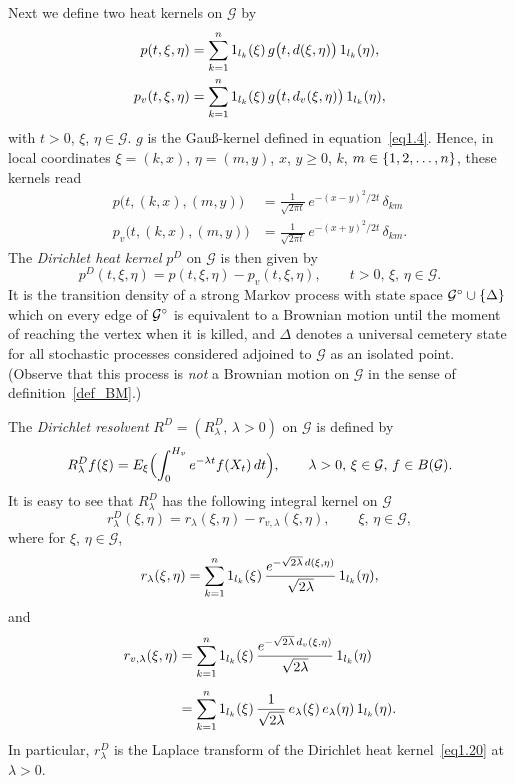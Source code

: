 \documentclass[11pt,a4paper]{amsart}
\newcommand{\gd}{\delta}
\newcommand{\gl}{\lambda}
\newcommand{\gD}{\Delta}
\newcommand{\cG}{\mathcal{G}}
\newcommand{\1}{1}
\theoremstyle{remark}
\newcommand{\op}{\ensuremath^\circ}
\newcommand{\sgl}{\ensuremath\sqrt{2\gl}}
\newcommand{\sn}{\ensuremath\{1,2,\dotsc,n\}}
\newcommand{\onel}[1][k]{\ensuremath1_{l_{#1}}}
\numberwithin{equation}{section}
\begin{document}
Next we define two heat kernels on $\cG$ by
\begin{align}
    p(t,\xi,\eta)   &= \sum_{k=1}^n \onel(\xi)\, g\bigl(t,d(\xi,\eta)\bigr)\,\onel(\eta),
                    \label{eq1.16}\\
    p_v(t,\xi,\eta) &= \sum_{k=1}^n \onel(\xi)\, g\bigl(t,d_v(\xi,\eta)\bigr)\,\onel(\eta),
                    \label{eq1.17}
\end{align}
with $t>0$, $\xi$, $\eta\in\cG$. $g$ is the Gau{\ss}-kernel defined in
equation~\eqref{eq1.4}. Hence, in local coordinates $\xi=(k,x)$, $\eta=(m,y)$, $x$, $y\ge
0$, $k$, $m\in\sn$, these kernels read
\begin{align}
    p\bigl(t,(k,x),(m,y)\bigr)
        &= \frac{1}{\sqrt{2\pi t}}\,e^{-(x-y)^2/2t}\,\gd_{km}\label{eq1.18}\\
    p_v\bigl(t,(k,x),(m,y)\bigr)
        &= \frac{1}{\sqrt{2\pi t}}\,e^{-(x+y)^2/2t}\,\gd_{km}\label{eq1.19}.
\end{align}
The \emph{Dirichlet heat kernel} $p^D$ on $\cG$ is then given by
\begin{equation}    \label{eq1.20}
    p^D(t,\xi,\eta) = p(t,\xi,\eta) - p_v(t,\xi,\eta),\qquad t>0,\,\xi,\,\eta\in\cG.
\end{equation}
It is the transition density of a strong Markov process with state space
$\cG\op\cup\{\gD\}$ which on every edge of $\cG\op$ is equivalent to a Brownian
motion until the moment of reaching the vertex when it is
killed, and $\gD$ denotes a universal cemetery state for all stochastic processes
considered adjoined to $\cG$ as an isolated point. (Observe that this process is
\emph{not} a Brownian motion on $\cG$ in the sense of
definition~\ref{def_BM}.)

The \emph{Dirichlet resolvent} $R^D = (R^D_\gl,\,\gl>0)$ on $\cG$ is defined by
\begin{equation}    \label{eq1.21}
    R^D_\gl f(\xi)
        = E_\xi\Bigl(\int_0^{H_v} e^{-\gl t} f(X_t)\,dt\Bigr),\qquad
            \gl>0,\,\xi\in\cG,\,f\in B(\cG).
\end{equation}
It is easy to see that $R^D_\gl$ has the following integral kernel on $\cG$
\begin{equation}    \label{eq1.22}
    r^D_\gl(\xi,\eta) = r_\gl(\xi,\eta) - r_{v,\gl}(\xi,\eta),\qquad \xi,\,\eta\in\cG,
\end{equation}
where for $\xi$, $\eta\in\cG$,
\begin{equation}    \label{eq1.22a}
    r_\gl(\xi,\eta) = \sum_{k=1}^n \onel(\xi)\,\frac{e^{-\sgl\,d(\xi,\eta)}}{\sgl}\,\onel(\eta),
\end{equation}
and
\begin{equation}    \label{eq1.22b}
\begin{split}
    r_{v,\gl}(\xi,\eta)
        &= \sum_{k=1}^n \onel(\xi)\, \frac{e^{-\sgl\, d_v(\xi,\eta)}}{\sgl}\,\onel(\eta)\\[1ex]
        &= \sum_{k=1}^n \onel(\xi)\, \frac{1}{\sgl}\,e_\gl(\xi)\, e_\gl(\eta)\,\onel(\eta).
\end{split}
\end{equation}
In particular, $r^D_\gl$ is the Laplace transform of the Dirichlet heat
kernel~\eqref{eq1.20} at $\gl>0$.
\end{document}
